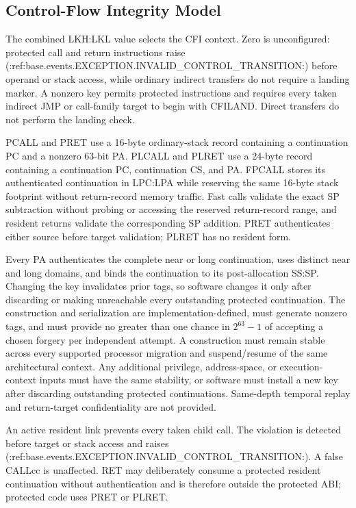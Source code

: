 \subsection{Control-Flow Integrity Model}\label{section:cfi-model}
The combined LKH:LKL value selects the CFI context. Zero is unconfigured: protected call and return instructions raise (:ref:base.events.EXCEPTION.INVALID_CONTROL_TRANSITION:) before operand or stack access, while ordinary indirect transfers do not require a landing marker. A nonzero key permits protected instructions and requires every taken indirect JMP or call-family target to begin with CFILAND. Direct transfers do not perform the landing check.

PCALL and PRET use a 16-byte ordinary-stack record containing a continuation PC and a nonzero 63-bit PA. PLCALL and PLRET use a 24-byte record containing a continuation PC, continuation CS, and PA. FPCALL stores its authenticated continuation in LPC:LPA while reserving the same 16-byte stack footprint without return-record memory traffic. Fast calls validate the exact SP subtraction without probing or accessing the reserved return-record range, and resident returns validate the corresponding SP addition. PRET authenticates either source before target validation; PLRET has no resident form.

Every PA authenticates the complete near or long continuation, uses distinct near and long domains, and binds the continuation to its post-allocation SS:SP. Changing the key invalidates prior tags, so software changes it only after discarding or making unreachable every outstanding protected continuation. The construction and serialization are implementation-defined, must generate nonzero tags, and must provide no greater than one chance in $2^{63}-1$ of accepting a chosen forgery per independent attempt. A construction must remain stable across every supported processor migration and suspend/resume of the same architectural context. Any additional privilege, address-space, or execution-context inputs must have the same stability, or software must install a new key after discarding outstanding protected continuations. Same-depth temporal replay and return-target confidentiality are not provided.

An active resident link prevents every taken child call. The violation is detected before target or stack access and raises (:ref:base.events.EXCEPTION.INVALID_CONTROL_TRANSITION:). A false CALLcc is unaffected. RET may deliberately consume a protected resident continuation without authentication and is therefore outside the protected ABI; protected code uses PRET or PLRET.

